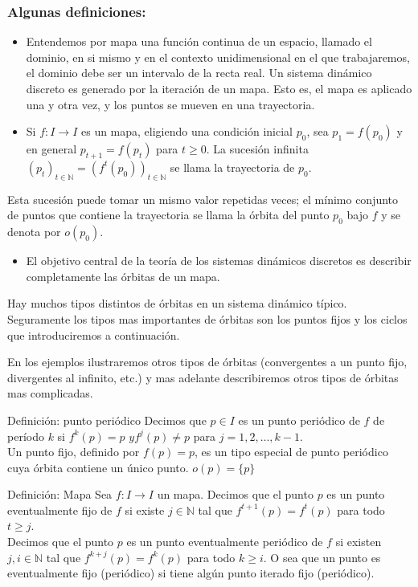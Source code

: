 \documentclass[11pt]{beamer}
\begin{document}
\begin{frame}[allowframebreaks]
\frametitle{Algunas definiciones:}

\begin{itemize}
  \item Entendemos por mapa una función continua de un espacio, llamado el dominio, en si mismo y en el contexto unidimensional en el que trabajaremos, el dominio debe ser un intervalo de la recta real. Un sistema dinámico discreto es generado por la iteración de un mapa. Esto es, el mapa es aplicado una y otra vez, y los puntos se mueven en una trayectoria.
  \item Si $f: I \rightarrow I$ es un mapa, eligiendo una condición inicial $p_{0}$, sea $p_{1}=f\left(p_{0}\right)$ y en general $p_{t+1}=f\left(p_{t}\right)$ para $t \geq 0$. La sucesión infinita $\left(p_{t}\right)_{t \in \mathbb{N}}=\left(f^{t}\left(p_{0}\right)\right)_{t \in \mathbb{N}}$ se llama la trayectoria de $p_{0}$.
\end{itemize}

Esta sucesión puede tomar un mismo valor repetidas veces; el mínimo conjunto de puntos que contiene la trayectoria se llama la órbita del punto $p_{0}$ bajo $f$ y se denota por $o\left(p_{0}\right)$.

\begin{itemize}
  \item El objetivo central de la teoría de los sistemas dinámicos discretos es describir completamente las órbitas de un mapa.
\end{itemize}

Hay muchos tipos distintos de órbitas en un sistema dinámico típico. Seguramente los tipos mas importantes de órbitas son los puntos fijos y los ciclos que introduciremos a continuación.

En los ejemplos ilustraremos otros tipos de órbitas (convergentes a un punto fijo, divergentes al infinito, etc.) y mas adelante describiremos otros tipos de órbitas mas complicadas.

\begin{block}{Definición: punto periódico}
Decimos que $p \in I$ es un punto periódico de $f$ de período $k$ si $f^{k}(p)=p$ $y f^{j}(p) \neq p$ para $j=1,2, \ldots, k-1$.\\
Un punto fijo, definido por $f(p)=p$, es un tipo especial de punto periódico cuya órbita contiene un único punto. $o(p)=\{p\}$
\end{block}

\begin{block}{Definición: Mapa}
Sea $f: I \rightarrow I$ un mapa. Decimos que el punto $p$ es un punto eventualmente fijo de $f$ si existe $j \in \mathbb{N}$ tal que $f^{t+1}(p)=f^{t}(p)$ para todo $t \geq j$.\\
Decimos que el punto $p$ es un punto eventualmente periódico de $f$ si existen $j, i \in \mathbb{N}$ tal que $f^{k+j}(p)=f^{k}(p)$ para todo $k \geq i$. O sea que un punto es eventualmente fijo (periódico) si tiene algún punto iterado fijo (periódico).
\end{block}


\end{frame}
\end{document}
